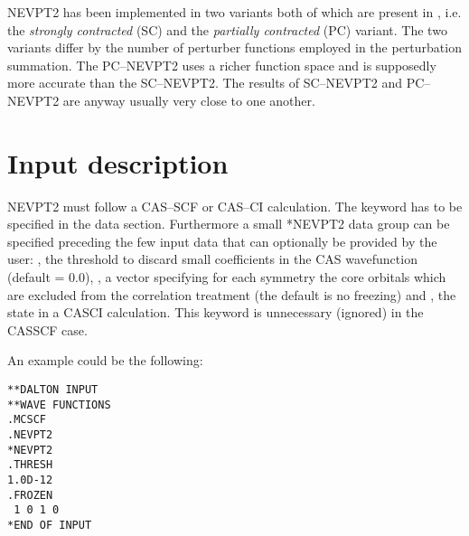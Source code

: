 NEVPT2 has been implemented in two variants both of which are present
in \dalton, i.e. the \emph{strongly contracted} (SC) and the
\emph{partially contracted} (PC) variant. The two variants differ by
the number of perturber functions employed in the perturbation
summation. The PC--NEVPT2 uses a richer function space and is
supposedly more accurate than the SC--NEVPT2. The results of
SC--NEVPT2 and PC--NEVPT2 are anyway usually very close to one
another.

\begin{center}
\end{center}

\section{Input description}\label{sec:nevpt2input}

NEVPT2 must follow a CAS--SCF or CAS--CI calculation. The keyword
 has to be specified in the  data
section. Furthermore a small {*NEVPT2} data group
 can be specified preceding the few input data that can
optionally be provided by the user:
,
the threshold to discard small coefficients in the CAS wavefunction
(default = 0.0),
,
a vector specifying for each symmetry the core orbitals which are
excluded from the correlation treatment (the default is no
freezing) and
,
the state in a CASCI calculation. This keyword is unnecessary
(ignored) in the CASSCF case.

An example could be the following:

\begin{verbatim}
**DALTON INPUT
**WAVE FUNCTIONS
.MCSCF
.NEVPT2
*NEVPT2
.THRESH
1.0D-12
.FROZEN
 1 0 1 0
*END OF INPUT
\end{verbatim}
